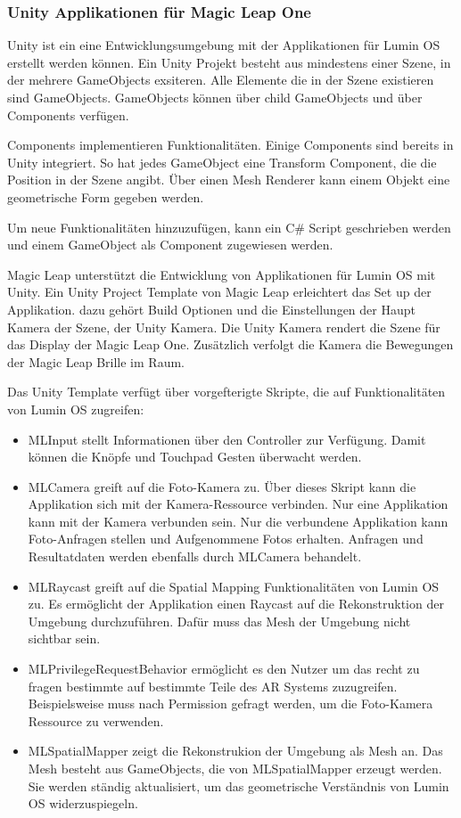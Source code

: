 \subsubsection{Unity Applikationen für Magic Leap One}

Unity ist ein eine Entwicklungsumgebung mit der Applikationen für Lumin OS erstellt werden können. Ein Unity Projekt besteht aus mindestens einer Szene, in der mehrere GameObjects exsiteren. Alle Elemente die in der Szene existieren sind GameObjects. GameObjects können über child GameObjects und über Components verfügen. 


Components implementieren Funktionalitäten. Einige Components sind bereits in Unity integriert. So hat jedes GameObject eine Transform Component, die die Position in der Szene angibt. Über einen Mesh Renderer kann einem Objekt eine geometrische Form gegeben werden.

Um neue Funktionalitäten hinzuzufügen, kann ein C\# Script geschrieben werden und einem GameObject als Component zugewiesen werden.

Magic Leap unterstützt die Entwicklung von Applikationen für Lumin OS mit Unity. Ein Unity Project Template von Magic Leap erleichtert das Set up der Applikation. dazu gehört Build Optionen und die Einstellungen der Haupt Kamera der Szene, der Unity Kamera. Die Unity Kamera rendert die Szene für das Display der Magic Leap One. Zusätzlich verfolgt die Kamera die Bewegungen der Magic Leap Brille im Raum. %

Das Unity Template verfügt über vorgefterigte Skripte, die auf Funktionalitäten von Lumin OS zugreifen:

\begin{itemize}
	\item MLInput stellt Informationen über den Controller zur Verfügung. Damit können die Knöpfe und Touchpad Gesten überwacht werden.
	\item MLCamera greift auf die Foto-Kamera zu. Über dieses Skript kann die Applikation sich mit der Kamera-Ressource verbinden. Nur eine Applikation kann mit der Kamera verbunden sein. Nur die verbundene Applikation kann Foto-Anfragen stellen und Aufgenommene Fotos erhalten. Anfragen und Resultatdaten werden ebenfalls durch MLCamera behandelt.
	\item MLRaycast greift auf die Spatial Mapping Funktionalitäten von Lumin OS zu. Es ermöglicht der Applikation einen Raycast auf die Rekonstruktion der Umgebung durchzuführen. Dafür muss das Mesh der Umgebung nicht sichtbar sein.
	\item MLPrivilegeRequestBehavior ermöglicht es den Nutzer um das recht zu fragen bestimmte auf bestimmte Teile des AR Systems zuzugreifen. Beispielsweise muss nach Permission gefragt werden, um die Foto-Kamera Ressource zu verwenden. 
	\item MLSpatialMapper zeigt die Rekonstrukion der Umgebung als Mesh an. Das Mesh besteht aus GameObjects, die von MLSpatialMapper erzeugt werden. Sie werden ständig aktualisiert, um das geometrische Verständnis von Lumin OS widerzuspiegeln.
\end{itemize}

